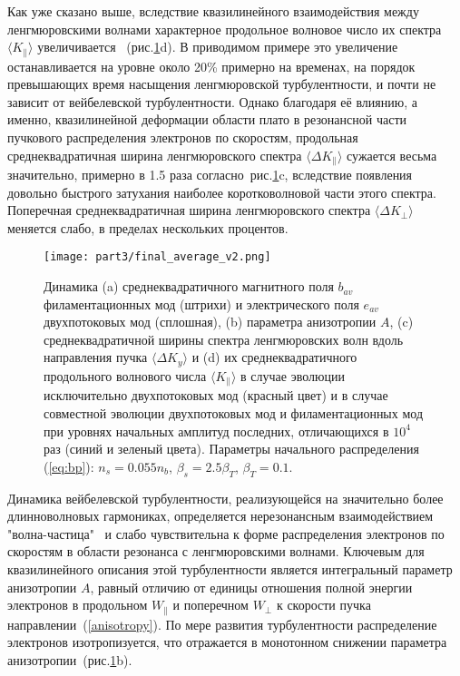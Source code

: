 Как уже сказано выше, вследствие квазилинейного взаимодействия между ленгмюровскими волнами характерное продольное волновое число их спектра $\langle K_\|\rangle$ увеличивается ~(рис.\ref{fig:average1}d). В приводимом примере это увеличение останавливается на уровне около 20\% примерно на временах, на порядок превышающих время насыщения ленгмюровской турбулентности, и почти не зависит от вейбелевской турбулентности. Однако благодаря её влиянию, а именно, квазилинейной деформации области плато в резонансной части пучкового распределения электронов по скоростям,  продольная среднеквадратичная ширина ленгмюровского спектра $\langle \Delta K_\|\rangle$ сужается весьма значительно, примерно в 1.5 раза согласно~рис.\ref{fig:average1}c, вследствие появления довольно быстрого затухания наиболее коротковолновой части этого спектра. Поперечная среднеквадратичная ширина ленгмюровского спектра $\langle \Delta K_\perp\rangle$ меняется слабо, в пределах нескольких процентов.

\begin{figure}[h]
\texttt{[image: part3/final\_average\_v2.png]}
\centering
{}
\caption{Динамика (a) среднеквадратичного магнитного поля $b_{av}$ филаментационных мод (штрихи) и электрического поля $e_{av}$ двухпотоковых мод (сплошная), (b) параметра анизотропии $A$,  (c) среднеквадратичной ширины спектра ленгмюровских волн вдоль направления пучка $\langle \Delta K_y\rangle$ и (d) их среднеквадратичного продольного волнового числа $\langle K_\|\rangle$  в случае эволюции исключительно двухпотоковых мод (красный цвет) и в случае совместной эволюции двухпотоковых мод и филаментационных мод при уровнях начальных амплитуд последних, отличающихся в $10^4$ раз (синий и зеленый цвета). Параметры начального распределения (\ref{eq:bp}): $n_s=0.055n_b$, $\beta_s=2.5\beta_T$, $\beta_T=0.1$.}
\label{fig:average1}
\end{figure}

Динамика вейбелевской турбулентности, реализующейся на значительно более длинноволновых гармониках, определяется нерезонансным взаимодействием "волна-частица"~\cite{GaleevSagdeev1969,Kuznetsov2023} и слабо чувствительна к форме распределения электронов по скоростям в области резонанса с ленгмюровскими волнами. Ключевым для квазилинейного описания этой турбулентности является интегральный параметр анизотропии $A$, равный отличию от единицы отношения полной энергии электронов в продольном $W_\|$ и поперечном $W_\perp$ к скорости пучка направлении~(\ref{anisotropy}). По мере развития турбулентности распределение электронов изотропизуется, что отражается в монотонном снижении параметра анизотропии~(рис.\ref{fig:average1}b).

